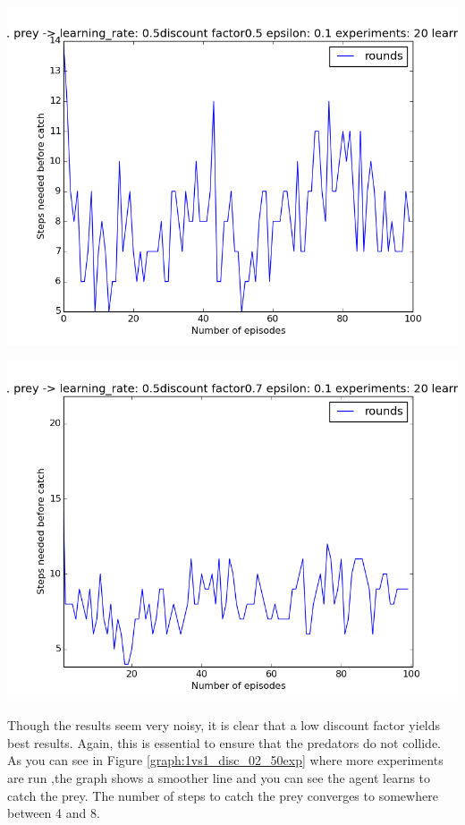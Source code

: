 \begin{center}
	\includegraphics[scale=0.3]{minimax_100rounds_20exp_disc05_alpha05}
	\label{graph:1vs1_disc_05}
\end{center}

\begin{center}
	\includegraphics[scale=0.3]{minimax_100rounds_20exp_disc07_alpha05}
	\label{graph:1vs1_disc_07}
\end{center}

Though the results seem very noisy, it is clear that a low discount factor yields best results. Again, this is essential to ensure that the predators do not collide. As you can see in Figure \ref{graph:1vs1_disc_02_50exp} where more experiments are run ,the graph shows a smoother line and you can see the agent learns to catch the prey. The number of steps to catch the prey converges to somewhere between 4 and 8.  


